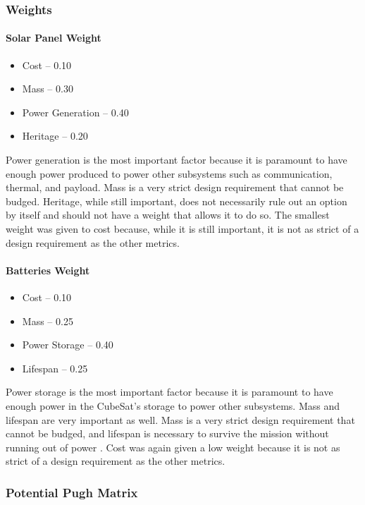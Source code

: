 \subsubsection{Weights}
\paragraph{Solar Panel Weight}
\begin{itemize}
    \item Cost – 0.10
    \item Mass – 0.30
    \item Power Generation – 0.40
    \item Heritage – 0.20
\end{itemize}
Power generation is the most important factor because it is paramount to have enough power produced to power other subsystems such as communication, thermal, and payload.  Mass is a very strict design requirement that cannot be budged.  Heritage, while still important, does not necessarily rule out an option by itself and should not have a weight that allows it to do so.  The smallest weight was given to cost because, while it is still important, it is not as strict of a design requirement as the other metrics.
\paragraph{Batteries Weight}
\begin{itemize}
    \item Cost – 0.10
    \item Mass – 0.25
    \item Power Storage – 0.40
    \item Lifespan – 0.25
\end{itemize}    
Power storage is the most important factor because it is paramount to have enough power in the CubeSat's storage to power other subsystems.  Mass and lifespan are very important as well.  Mass is a very strict design requirement that cannot be budged, and lifespan is necessary to survive the mission without running out of power .  Cost was again given a low weight because it is not as strict of a design requirement as the other metrics.
\subsubsection{Potential Pugh Matrix}
